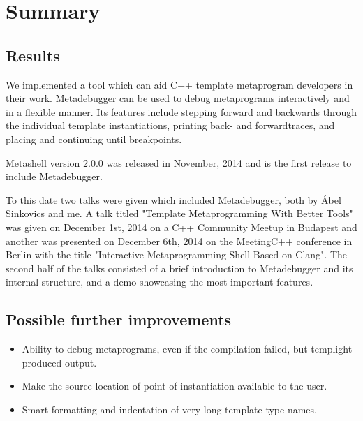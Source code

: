 
\chapter{Summary} \label{summary}

\section{Results}

We implemented a tool which can aid C++ template metaprogram developers in
their work. Metadebugger can be used to debug metaprograms interactively and in
a flexible manner. Its features include stepping forward and backwards through
the individual template instantiations, printing back- and forwardtraces,
and placing and continuing until breakpoints.

Metashell version 2.0.0 was released in November, 2014\cite{github-releases}
and is the first release to include Metadebugger.

To this date two talks were given which included Metadebugger, both by Ábel
Sinkovics and me. A talk titled "Template Metaprogramming With Better Tools"
was given on December 1st, 2014 on a C++ Community Meetup in
Budapest\cite{cpp-meetup} and another was presented on December 6th, 2014 on
the MeetingC++ conference in Berlin with the title "Interactive Metaprogramming
Shell Based on Clang"\cite{meeting-cpp}. The second half of the talks consisted
of a brief introduction to Metadebugger and its internal structure, and a demo
showcasing the most important features.

\section{Possible further improvements}

\begin{itemize}
    \item
        Ability to debug metaprograms, even if the compilation failed, but
        templight produced output.
    \item
        Make the source location of point of instantiation available to the
        user.
    \item
        Smart formatting and indentation of very long template type names.
\end{itemize}
